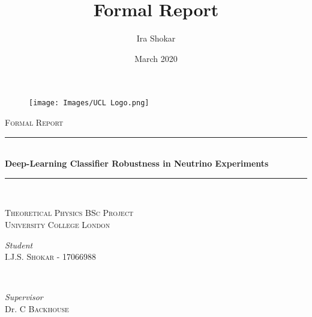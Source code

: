 \documentclass{report}
\title{Formal Report}
\author{Ira Shokar}
\date{March 2020}
\begin{document}
\begin{titlepage} %

\begin{figure}
    \vspace{-3.2cm} \hspace{-3.9in}
    \texttt{[image: Images/UCL Logo.png]}
     \vspace{2cm}
\end{figure}


	\newcommand{\HRule}{\rule{\linewidth}{0.5mm}} %
	
	\center %
	
	
	
	
	\textsc{\LARGE Formal Report}\\[1.5cm] %
	
	\vspace{-0.5cm}
	
		\HRule\\[0.4cm]
	
	{\huge\bfseries Deep-Learning Classifier Robustness in Neutrino Experiments}\\[0.2cm] %
	
	\HRule\\[1.5cm]
	
	\vspace{-0.5cm}
	
	\textsc{\Large Theoretical Physics BSc Project}\\[0.5cm] %
	
	\textsc{\large University College London}\\[0.5cm] %
	
	
    \vspace{0.5cm}
	
	\begin{minipage}{0.4\textwidth}
		\begin{flushleft}
			\large
			\textit{Student}\\
			I.J.S. \textsc{Shokar - 17066988} %
		\end{flushleft}
	\end{minipage}
	~
	\begin{minipage}{0.4\textwidth}
		\begin{flushright}
			\large
			\textit{Supervisor}\\
			Dr. C \textsc{Backhouse} %
		\end{flushright}
	\end{minipage}
	

\end{titlepage}
\end{document}
